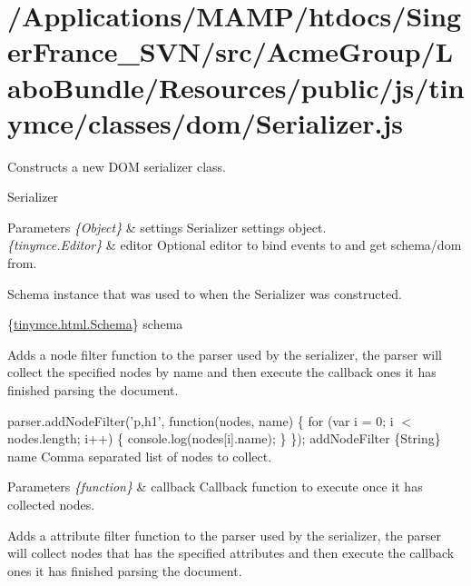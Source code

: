 \hypertarget{_2_applications_2_m_a_m_p_2htdocs_2_singer_france__s_v_n_2src_2_acme_group_2_labo_bundle_2_resoub46421162f7cac9fbfa4fcb29e2c2d66}{\section{/\+Applications/\+M\+A\+M\+P/htdocs/\+Singer\+France\+\_\+\+S\+V\+N/src/\+Acme\+Group/\+Labo\+Bundle/\+Resources/public/js/tinymce/classes/dom/\+Serializer.\+js}
}
Constructs a new D\+O\+M serializer class.

Serializer 
\begin{DoxyParams}{Parameters}
{\em \{\+Object\}} & settings Serializer settings object. \\
\hline
{\em \{tinymce.\+Editor\}} & editor Optional editor to bind events to and get schema/dom from.\\
\hline
\end{DoxyParams}
Schema instance that was used to when the Serializer was constructed.

\{\hyperlink{classtinymce_1_1html_1_1_schema}{tinymce.\+html.\+Schema}\} schema

Adds a node filter function to the parser used by the serializer, the parser will collect the specified nodes by name and then execute the callback ones it has finished parsing the document.

parser.\+add\+Node\+Filter('p,h1', function(nodes, name) \{ for (var i = 0; i $<$ nodes.\+length; i++) \{ console.\+log(nodes\mbox{[}i\mbox{]}.name); \} \});  add\+Node\+Filter  \{String\} name Comma separated list of nodes to collect. 
\begin{DoxyParams}{Parameters}
{\em \{function\}} & callback Callback function to execute once it has collected nodes.\\
\hline
\end{DoxyParams}
Adds a attribute filter function to the parser used by the serializer, the parser will collect nodes that has the specified attributes and then execute the callback ones it has finished parsing the document.


\begin{DoxyCodeInclude}
\end{DoxyCodeInclude}
 